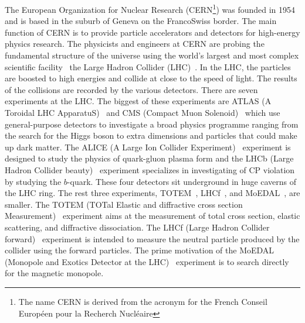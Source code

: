 The European Organization for Nuclear Research (CERN\footnote{The name CERN is derived from the acronym for the French Conseil Europ\'{e}en pour la Recherch Nucl\'{e}aire}) was founded in 1954 and is based in the suburb of Geneva on the Franco\textendash Swiss border.
The main function of CERN is to provide particle accelerators and detectors for high-energy physics research.
The physicists and engineers at CERN are probing the fundamental structure of the universe using the world's largest and most complex scientific facility \textemdash \ the Large Hadron Collider (LHC)~\cite{1748-0221-3-08-S08001}.
In the LHC, the particles are boosted to high energies and collide at close to the speed of light.
The results of the collisions are recorded by the various detectors.
There are seven experiments at the LHC.
The biggest of these experiments are ATLAS (A Toroidal LHC ApparatuS)~\cite{1748-0221-3-08-S08003} and CMS (Compact Muon Solenoid)~\cite{1748-0221-3-08-S08004} which use general-purpose detectors to investigate a broad physics programme ranging from the search for the Higgs boson to extra dimensions and particles that could make up dark matter.
The ALICE (A Large Ion Collider Experiment)~\cite{1748-0221-3-08-S08002} experiment is designed to study the physics of quark-gluon plasma form and the LHCb (Large Hadron Collider beauty)~\cite{1748-0221-3-08-S08005} experiment specializes in investigating of CP violation by studying the $b$-quark.
These four detectors sit underground in huge caverns of the LHC ring.
The rest three experiments, TOTEM~\cite{1748-0221-3-08-S08007}, LHCf~\cite{1748-0221-3-08-S08006}, and MoEDAL~\cite{Pinfold:1181486}, are smaller.
The TOTEM (TOTal Elastic and diffractive cross section Measurement)~\cite{1748-0221-3-08-S08007} experiment aims at the measurement of total cross section, elastic scattering, and diffractive dissociation.
The LHCf (Large Hadron Collider forward)~\cite{1748-0221-3-08-S08006} experiment is intended to measure the neutral particle produced by the collider using the forward particles.
The prime motivation of the MoEDAL (Monopole and Exotics Detector at the LHC)~\cite{Pinfold:1181486} experiment is to search directly for the magnetic monopole.

